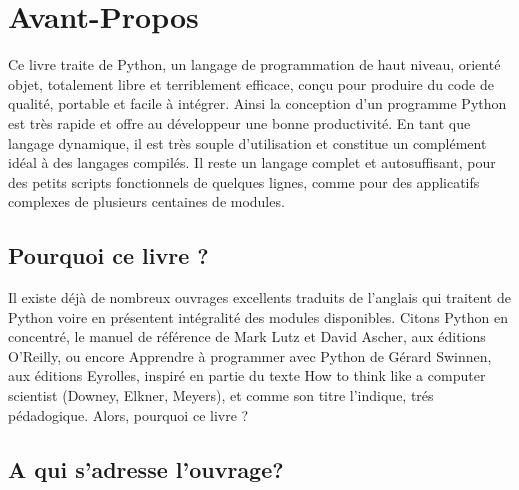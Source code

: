 \section{Avant-Propos}
Ce livre traite de Python, un langage de programmation de haut niveau, orienté objet,
totalement libre et terriblement efficace, conçu pour produire du code de qualité, 
portable et facile à intégrer. Ainsi la conception d'un programme Python est très rapide et
offre au développeur une bonne productivité. En tant que langage dynamique, il est
très souple d'utilisation et constitue un complément idéal à des langages compilés.
Il reste un langage complet et autosuffisant, pour des petits scripts fonctionnels de 
quelques lignes, comme pour des applicatifs complexes de plusieurs centaines de modules.

\subsection*{Pourquoi ce livre ?}
Il existe déjà de nombreux ouvrages excellents traduits de l'anglais qui traitent de
Python voire en présentent intégralité des modules disponibles. Citons Python en
concentré, le manuel de référence de Mark Lutz et David Ascher, aux éditions
O'Reilly, ou encore Apprendre à programmer avec Python de Gérard Swinnen, aux
éditions Eyrolles, inspiré en partie du texte How to think like a computer scientist
(Downey, Elkner, Meyers), et comme son titre l'indique, tr\'es p\'edadogique.
Alors, pourquoi ce livre ?

\subsection*{A qui s'adresse l'ouvrage?}